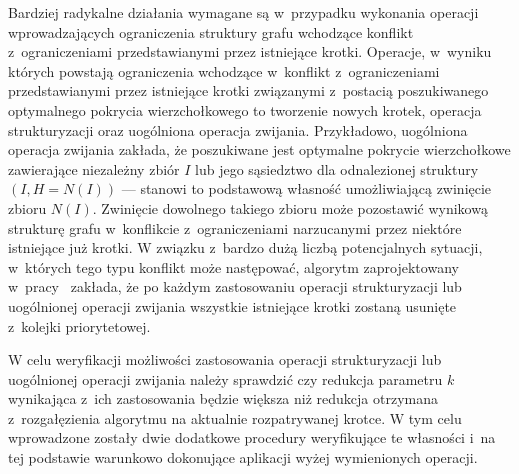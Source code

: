 \par{
  Bardziej radykalne działania wymagane są w~przypadku wykonania operacji wprowadzających ograniczenia struktury grafu wchodzące konflikt z~ograniczeniami przedstawianymi przez istniejące krotki.
  Operacje, w~wyniku których powstają ograniczenia wchodzące w~konflikt z~ograniczeniami przedstawianymi przez istniejące krotki związanymi z~postacią poszukiwanego optymalnego pokrycia wierzchołkowego to tworzenie nowych krotek, operacja strukturyzacji oraz uogólniona operacja zwijania.
  Przykładowo, uogólniona operacja zwijania zakłada, że poszukiwane jest optymalne pokrycie wierzchołkowe zawierające niezależny zbiór $I$ lub jego sąsiedztwo dla odnalezionej struktury $(I, H=N(I))$ --- stanowi to podstawową własność umożliwiającą zwinięcie zbioru $N(I)$.
  Zwinięcie dowolnego takiego zbioru może pozostawić wynikową strukturę grafu w~konflikcie z~ograniczeniami narzucanymi przez niektóre istniejące już krotki.
  W związku z~bardzo dużą liczbą potencjalnych sytuacji, w~których tego typu konflikt może następować, algorytm zaprojektowany w~pracy~\cite{ImprovedBounds10} zakłada, że po każdym zastosowaniu operacji strukturyzacji lub uogólnionej operacji zwijania wszystkie istniejące krotki zostaną usunięte z~kolejki priorytetowej.

  W celu weryfikacji możliwości zastosowania operacji strukturyzacji lub uogólnionej operacji zwijania należy sprawdzić czy redukcja parametru $k$ wynikająca z~ich zastosowania będzie większa niż redukcja otrzymana z~rozgałęzienia algorytmu na aktualnie rozpatrywanej krotce.
  W tym celu wprowadzone zostały dwie dodatkowe procedury weryfikujące te własności i~na tej podstawie warunkowo dokonujące aplikacji wyżej wymienionych operacji.
}
